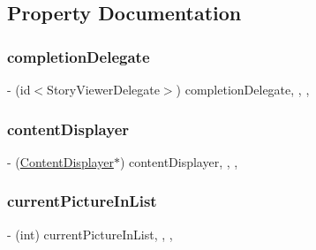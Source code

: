 \subsection{Property Documentation}
\hypertarget{interface_story_snap_view_controller_a8364d923054951348b8071a6773649c3}{}\label{interface_story_snap_view_controller_a8364d923054951348b8071a6773649c3} 
\subsubsection{\texorpdfstring{completion\+Delegate}{completionDelegate}}
{\footnotesize\ttfamily -\/ (id$<$Story\+Viewer\+Delegate$>$) completion\+Delegate\hspace{0.3cm}{\ttfamily [read]}, {\ttfamily [write]}, {\ttfamily [nonatomic]}, {\ttfamily [weak]}}

\hypertarget{interface_story_snap_view_controller_a1c5dae46de695864b887191fe61187c2}{}\label{interface_story_snap_view_controller_a1c5dae46de695864b887191fe61187c2} 
\subsubsection{\texorpdfstring{content\+Displayer}{contentDisplayer}}
{\footnotesize\ttfamily -\/ (\hyperlink{interface_content_displayer}{Content\+Displayer}$\ast$) content\+Displayer\hspace{0.3cm}{\ttfamily [read]}, {\ttfamily [write]}, {\ttfamily [nonatomic]}, {\ttfamily [strong]}}

\hypertarget{interface_story_snap_view_controller_a24797951ede1ab1ca41c510bb4ead648}{}\label{interface_story_snap_view_controller_a24797951ede1ab1ca41c510bb4ead648} 
\subsubsection{\texorpdfstring{current\+Picture\+In\+List}{currentPictureInList}}
{\footnotesize\ttfamily -\/ (int) current\+Picture\+In\+List\hspace{0.3cm}{\ttfamily [read]}, {\ttfamily [write]}, {\ttfamily [nonatomic]}, {\ttfamily [assign]}}

